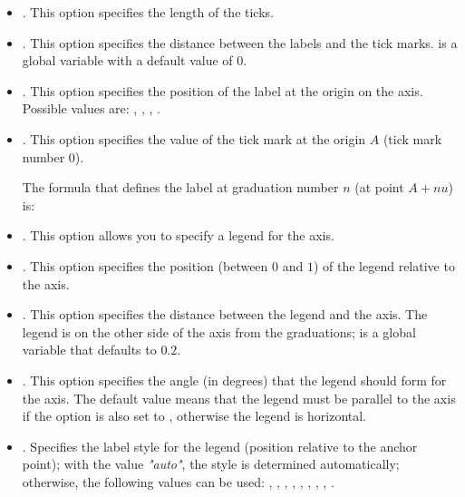 \begin{itemize}
    \item {}. This option specifies the length of the ticks.

    \item {}. This option specifies the distance between the labels and the tick marks.  is a global variable with a default value of $0$.

    \item {}. This option specifies the position of the label at the origin on the axis. Possible values ​​are: , , , .

    \item {}. This option specifies the value of the tick mark at the origin $A$ (tick mark number $0$).
    
The formula that defines the label at graduation number $n$ (at point $A+nu$) is: 

    \item {}. This option allows you to specify a legend for the axis.

    \item {}. This option specifies the position (between $0$ and $1$) of the legend relative to the axis.

    \item {}. This option specifies the distance between the legend and the axis. The legend is on the other side of the axis from the graduations;  is a global variable that defaults to $0.2$.

    \item {}. This option specifies the angle (in degrees) that the legend should form for the axis. The default value  means that the legend must be parallel to the axis if the  option is also set to , otherwise the legend is horizontal.

    \item {}. Specifies the label style for the legend (position relative to the anchor point); with the value \emph{"auto"}, the style is determined automatically; otherwise, the following values ​​can be used: , , , , , , , , .


\end{itemize}
